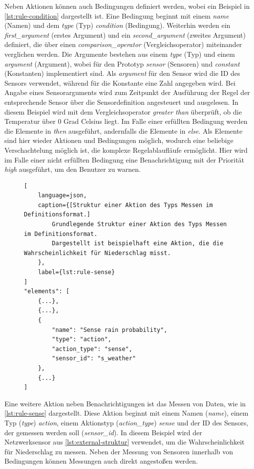 Neben Aktionen können auch Bedingungen definiert werden, wobei ein Beispiel in \cref{lst:rule-condition} dargestellt ist.
Eine Bedingung beginnt mit einem \emph{name} (Namen) und dem \emph{type} (Typ) \emph{condition} (Bedingung).
Weiterhin werden ein \emph{first\_argument} (erstes Argument) und ein \emph{second\_argument} (zweites Argument) definiert, die über einen \emph{comparison\_operator} (Vergleichsoperator) miteinander verglichen werden.
Die Argumente bestehen aus einem \emph{type} (Typ) und einem \emph{argument} (Argument), wobei für den Prototyp \emph{sensor} (Sensoren) und \emph{constant} (Konstanten) implementiert sind.
Als \emph{argument} für den Sensor wird die ID des Sensors verwendet, während für die Konstante eine Zahl angegeben wird.
Bei Angabe eines Sensorarguments wird zum Zeitpunkt der Ausführung der Regel der entsprechende Sensor über die Sensordefinition angesteuert und ausgelesen.
In diesem Beispiel wird mit dem Vergleichsoperator \emph{greater than} überprüft, ob die Temperatur über 0 Grad Celsius liegt.
Im Falle einer erfüllten Bedingung werden die Elemente in \emph{then} ausgeführt, andernfalls die Elemente in \emph{else}.
Als Elemente sind hier wieder Aktionen und Bedingungen möglich, wodurch eine beliebige Verschachtelung möglich ist, die komplexe Regelablaufläufe ermöglicht.
Hier wird im Falle einer nicht erfüllten Bedingung eine Benachrichtigung mit der Priorität \emph{high} ausgeführt, um den Benutzer zu warnen.

\begin{figure}[!htb]
\begin{lstlisting}[
	language=json,
	caption={[Struktur einer Aktion des Typs Messen im Definitionsformat.]
		Grundlegende Struktur einer Aktion des Typs Messen im Definitionsformat.
		Dargestellt ist beispielhaft eine Aktion, die die Wahrscheinlichkeit für Niederschlag misst.
	},
	label={lst:rule-sense}
]
"elements": [
	{...},
	{...},
	{
		"name": "Sense rain probability",
		"type": "action",
		"action_type": "sense",
		"sensor_id": "s_weather"
	},
	{...}
]
\end{lstlisting}
\end{figure}

Eine weitere Aktion neben Benachrichtigungen ist das Messen von Daten, wie in \cref{lst:rule-sense} dargestellt.
Diese Aktion beginnt mit einem Namen (\emph{name}), einem Typ (\emph{type}) \emph{action}, einem Aktionstyp (\emph{action\_type}) \emph{sense} und der ID des Sensors, der gemessen werden soll (\emph{sensor\_id}).
In diesem Beispiel wird der Netzwerksensor aus \cref{lst:external-struktur} verwendet, um die Wahrscheinlichkeit für Niederschlag zu messen.
Neben der Messung von Sensoren innerhalb von Bedingungen können Messungen auch direkt angestoßen werden.

